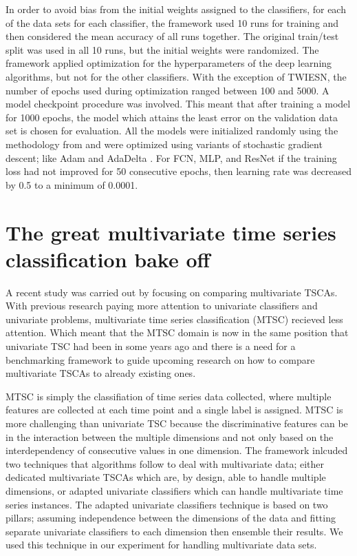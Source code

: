 In order to avoid bias from the initial weights assigned to the classifiers, for each of the data sets for each classifier, the framework used 10 runs for training and then considered the mean accuracy of all runs together.
The original train/test split was used in all 10 runs, but the initial weights were randomized.
The framework applied optimization for the hyperparameters of the deep learning algorithms, but not for the other classifiers.
With the exception of TWIESN, the number of epochs used during optimization ranged between 100 and 5000.
A model checkpoint procedure was involved. This meant that after training a model for 1000 epochs, the model which attains the least error on the validation data set is chosen for evaluation.
All the models were initialized randomly using the methodology from \cite{glorot2010understanding} and were optimized using variants of stochastic gradient descent; like Adam \cite{kingma2014adam} and AdaDelta \cite{zeiler2012adadelta}.
For FCN, MLP, and ResNet if the training loss had not improved for 50 consecutive epochs, then learning rate was decreased by 0.5 to a minimum of 0.0001.

\section{The great multivariate time series classification bake off}
\label{GreatBakeoffMultivariate}
A recent study was carried out by \cite{ruiz2020great} focusing on comparing multivariate TSCAs.
With previous research paying more attention to univariate classifiers and univariate problems, multivariate time series classification (MTSC) recieved less attention.
Which meant that the MTSC domain is now in the same position that univariate TSC had been in some years ago and there is a need for a benchmarking framework to
guide upcoming research on how to compare multivariate TSCAs to already existing ones.

MTSC is simply the classifiation of time series data collected, where multiple features are collected at each time point and a single label is assigned.
MTSC is more challenging than univariate TSC because the discriminative features can be in the interaction between the multiple dimensions
and not only based on the interdependency of consecutive values in one dimension.
The framework inlcuded two techniques that algorithms follow to deal with multivariate data; either dedicated multivariate TSCAs which are, by design, able to handle multiple dimensions,
or adapted univariate classifiers which can handle multivariate time series instances.
The adapted univariate classifiers technique is based on two pillars; assuming independence between the dimensions of the data and fitting separate
univariate classifiers to each dimension then ensemble their results. We used this technique in our experiment for handling multivariate data sets.


